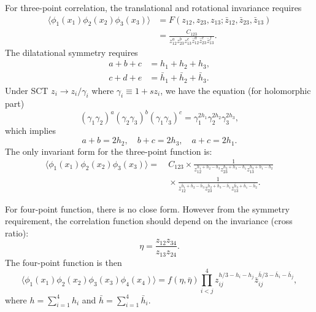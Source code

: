 \documentclass[aps,prb,superscriptaddress,nofootinbib]{revtex4}
\begin{document}
For three-point correlation, the translational and rotational invariance requires
\begin{equation}
\begin{aligned}
	\langle \phi_1(x_1)\phi_2(x_2)\phi_3(x_3)\rangle
	&= F(z_{12}, z_{23}, z_{13};\bar z_{12},\bar z_{23},\bar z_{13}) \\
	&= \frac{C_{123}}{z_{12}^a z_{23}^b z_{13}^c \bar z_{12}^d \bar z_{23}^e \bar z_{13}^f}.
\end{aligned}
\end{equation}
The dilatational symmetry requires
\begin{equation}
\begin{aligned}
	a + b + c &= h_1 + h_2 + h_3, \\
	c + d + e &= \bar h_1 + \bar h_2 + \bar h_3. 
\end{aligned}
\end{equation}
Under SCT $z_i \rightarrow z_i/\gamma_i$ where $\gamma_i \equiv 1+s z_i$, we have the equation (for holomorphic part)
\begin{equation}
	(\gamma_1\gamma_2)^a (\gamma_2\gamma_3)^b (\gamma_1\gamma_3)^c = \gamma_1^{2h_1} \gamma_2^{2h_2} \gamma_3^{2h_3},
\end{equation}
which implies
\begin{equation}
	a + b = 2h_2, \quad
	b + c = 2h_3, \quad
	a + c = 2h_1.
\end{equation}
The only invariant form for the three-point function is:
\begin{equation}
\begin{aligned}
	\langle \phi_1(x_1)\phi_2(x_2)\phi_3(x_3)\rangle 
	=&\ C_{123} \times \frac{1}{z_{12}^{h_{1}+h_{2}-h_{3}} z_{23}^{h_{2}+h_{3}-h_{1}} z_{13}^{h_{3}+h_{1}-h_{2}}} \\
	&\ \times \frac{1}{\bar{z}_{12}^{\bar{h}_{1}+\bar{h}_{2}-\bar{h}_{3}} \bar{z}_{23}^{\bar{h}_{2}+\bar{h}_{3}-\bar{h}_{1}} \bar{z}_{13}^{\bar{h}_{3}+\bar{h}_{1}-\bar{h}_{2}}}.
\end{aligned}
\end{equation} 

For four-point function, there is no close form.
However from the symmetry requirement, the correlation function should depend on the invariance (cross ratio):
\begin{equation}
	\eta = \frac{z_{12} z_{34}}{z_{13} z_{24}}.
\end{equation}
The four-point function is then
\begin{equation}
	\langle\phi_1(x_1)\phi_2(x_2)\phi_3(x_3)\phi_4(x_4)\rangle
	= f(\eta,\bar\eta) \prod_{i<j}^4 z_{ij}^{h/3-h_i-h_j} \bar z_{ij}^{\bar h/3-\bar h_i -\bar h_j},
\end{equation}
where $h = \sum_{i=1}^4 h_i$ and $\bar h = \sum_{i=1}^4 \bar h_i$.
\end{document}
